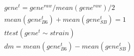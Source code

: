 \documentclass[12pt]{amsart}
\title{}
\author{}
\date{} %
\begin{document}
\begin{eqnarray}
  gene^{t} = gene^{raw} / mean(gene^{raw}) / 2  \\
  mean(gene^{t}_{B6}) + mean(gene^{t}_{SB}) = 1 \\
  ttest(gene^{t} \sim strain) \\
  dm = mean(gene^{t}_{B6}) - mean(gene^{t}_{SB})
\end{eqnarray}
\end{document}
